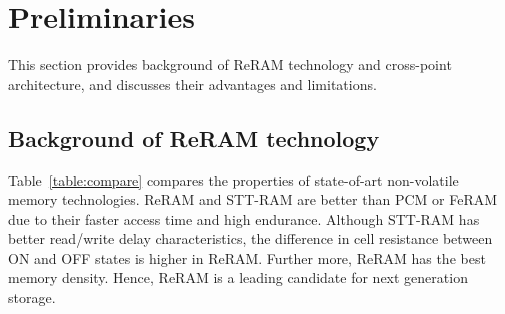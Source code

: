 \section{Preliminaries}\label{sec:preliminary}

This section provides background of ReRAM technology and cross-point architecture, and discusses their advantages and limitations. %


\subsection{Background of ReRAM technology}
Table~\ref{table:compare} compares the properties of state-of-art non-volatile memory technologies. ReRAM and STT-RAM are better than PCM or FeRAM due to their faster access time and high endurance.
Although STT-RAM has better read/write delay characteristics, the difference in cell resistance between ON and OFF states is higher in ReRAM. Further more, ReRAM has the best memory density.
Hence, ReRAM is a leading candidate for next generation storage.
%

